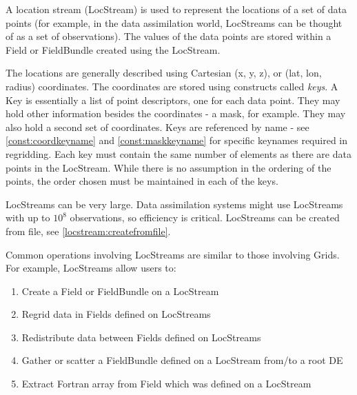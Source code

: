 %

A location stream (LocStream) is used to represent the locations of
a set of data points (for example, in the data assimilation world, 
LocStreams can be thought of as a set of observations).  The values 
of the data points are stored within a Field or FieldBundle created 
using the LocStream.

The locations are generally described using Cartesian (x, y, z), or 
(lat, lon, radius) coordinates.  The coordinates are stored using 
constructs called {\it keys}.  A Key is essentially a list of point 
descriptors, one for each data point.  They may hold other information 
besides the coordinates - a mask, for example.  They may also hold a 
second set of coordinates.    Keys are referenced by name - see 
\ref{const:coordkeyname} and \ref{const:maskkeyname} for specific 
keynames required in regridding.  Each key must contain the same 
number of elements as there are data points in the LocStream.  While 
there is no assumption in the ordering of the points, the order 
chosen must be maintained in each of the keys.

LocStreams can be very large. Data assimilation systems might use
LocStreams with up to $10^{8}$ observations, so efficiency is critical.
LocStreams can be created from file, see \ref{locstream:createfromfile}.

Common operations involving LocStreams are similar to those involving Grids.
For example, LocStreams allow users to:

\begin{enumerate}
\item Create a Field or FieldBundle on a LocStream
\item Regrid data in Fields defined on LocStreams
\item Redistribute data between Fields defined on LocStreams
\item Gather or scatter a FieldBundle defined on a LocStream from/to a root DE
\item Extract Fortran array from Field which was defined on a LocStream
\end{enumerate}


